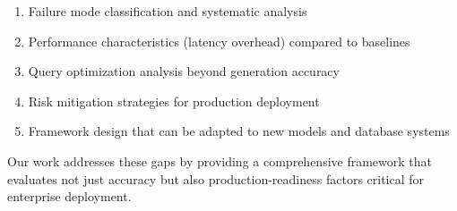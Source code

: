 \begin{enumerate}
    \item Failure mode classification and systematic analysis
    \item Performance characteristics (latency overhead) compared to baselines
    \item Query optimization analysis beyond generation accuracy
    \item Risk mitigation strategies for production deployment
    \item Framework design that can be adapted to new models and database systems
\end{enumerate}

Our work addresses these gaps by providing a comprehensive framework that evaluates not just accuracy but also production-readiness factors critical for enterprise deployment.
